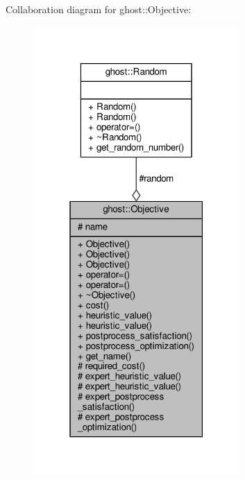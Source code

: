 Collaboration diagram for ghost\+:\+:Objective\+:
\nopagebreak
\begin{figure}[H]
\begin{center}
\leavevmode
\includegraphics[width=223pt]{classghost_1_1Objective__coll__graph}
\end{center}
\end{figure}

